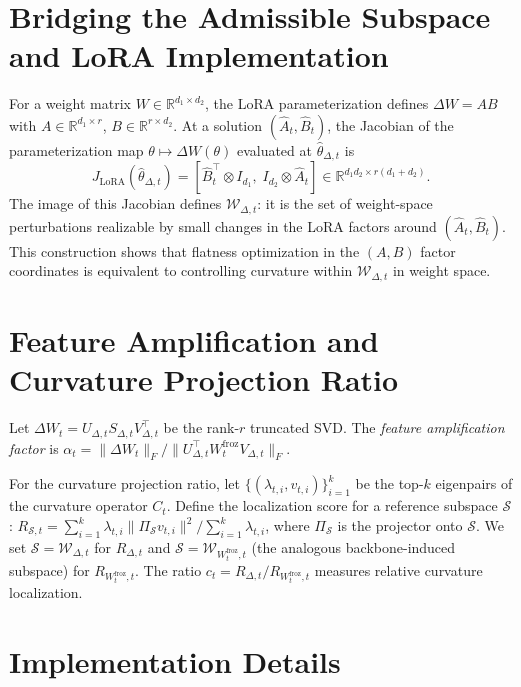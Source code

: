 \section{Bridging the Admissible Subspace and LoRA Implementation}
\label{app:lora_subspace_bridge}

For a weight matrix $W \in \mathbb{R}^{d_1 \times d_2}$, the LoRA parameterization defines $\Delta W = AB$ with $A \in \mathbb{R}^{d_1 \times r}$, $B \in \mathbb{R}^{r \times d_2}$.
At a solution $(\hat{A}_t, \hat{B}_t)$, the Jacobian of the parameterization map $\theta \mapsto \Delta W(\theta)$ evaluated at $\hat\theta_{\Delta,t}$ is
\[
J_{\mathrm{LoRA}}(\hat\theta_{\Delta,t}) = [\hat{B}_t^\top \otimes I_{d_1},\; I_{d_2} \otimes \hat{A}_t] \in \mathbb{R}^{d_1 d_2 \times r(d_1 + d_2)}.
\]
The image of this Jacobian defines $\mathcal{W}_{\Delta,t}$: it is the set of weight-space perturbations realizable by small changes in the LoRA factors around $(\hat{A}_t, \hat{B}_t)$.
This construction shows that flatness optimization in the $(A, B)$ factor coordinates is equivalent to controlling curvature within $\mathcal{W}_{\Delta,t}$ in weight space.

\section{Feature Amplification and Curvature Projection Ratio}
\label{app:weight_projection}

Let $\Delta W_t = U_{\Delta,t} S_{\Delta,t} V_{\Delta,t}^\top$ be the rank-$r$ truncated SVD.
The \emph{feature amplification factor} is $\alpha_t = \|\Delta W_t\|_F / \|U_{\Delta,t}^\top W_t^{\mathrm{froz}} V_{\Delta,t}\|_F$.

For the curvature projection ratio, let $\{(\lambda_{t,i}, v_{t,i})\}_{i=1}^k$ be the top-$k$ eigenpairs of the curvature operator $C_t$.
Define the localization score for a reference subspace $\mathcal{S}$:
$R_{\mathcal{S},t} = \sum_{i=1}^k \lambda_{t,i} \|\Pi_\mathcal{S} v_{t,i}\|^2 / \sum_{i=1}^k \lambda_{t,i}$,
where $\Pi_\mathcal{S}$ is the projector onto $\mathcal{S}$.
We set $\mathcal{S} = \mathcal{W}_{\Delta,t}$ for $R_{\Delta,t}$ and $\mathcal{S} = \mathcal{W}_{W_t^{\mathrm{froz}},t}$ (the analogous backbone-induced subspace) for $R_{W_t^{\mathrm{froz}},t}$.
The ratio $c_t = R_{\Delta,t} / R_{W_t^{\mathrm{froz}},t}$ measures relative curvature localization.

\section{Implementation Details}
\label{app:implementation}

